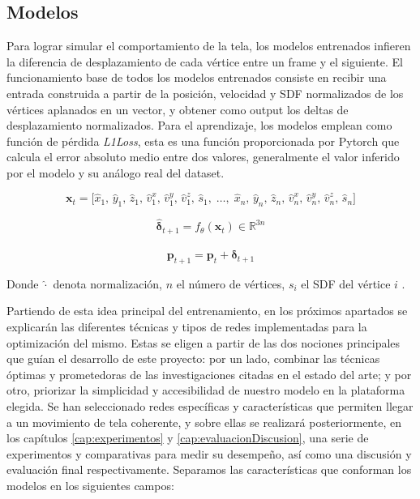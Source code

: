 \subsection{Modelos}
Para lograr simular el comportamiento de la tela, los modelos entrenados infieren la diferencia de desplazamiento de cada vértice entre un frame y el siguiente. El funcionamiento base de todos los modelos entrenados consiste en recibir una entrada construida a partir de la posición, velocidad y SDF normalizados de los vértices aplanados en un vector, y obtener como output los deltas de desplazamiento normalizados. Para el aprendizaje, los modelos emplean como función de pérdida \textit{L1Loss}, esta es una función proporcionada por Pytorch que calcula el error absoluto medio entre dos valores, generalmente el valor inferido por el modelo y su análogo real del dataset. \newline

\begin{equation}
    \mathbf{x}_{t} = \bigl[
        \hat{x}_1,\, \hat{y}_1,\, \hat{z}_1,\,
        \hat{v}^x_1,\, \hat{v}^y_1,\, \hat{v}^z_1,\,
        \hat{s}_1,\;
        \ldots,\;
        \hat{x}_n,\, \hat{y}_n,\, \hat{z}_n,\,
        \hat{v}^x_n,\, \hat{v}^y_n,\, \hat{v}^z_n,\,
        \hat{s}_n
    \bigr]
\end{equation}

\begin{equation}
    \hat{\boldsymbol{\delta}}_{t+1} = f_\theta(\mathbf{x}_{t}) \in \mathbb{R}^{3n}
\end{equation}

\begin{equation}
    \mathbf{p}_{t+1} = \mathbf{p}_{t} + \hat{\boldsymbol{\delta}}_{t+1}
\end{equation}

Donde $\hat{\cdot}$ denota normalización, $n$ el número de vértices, $s_i$ el SDF del vértice $i$ . \newline

Partiendo de esta idea principal del entrenamiento, en los próximos apartados se explicarán las diferentes técnicas y tipos de redes implementadas para la optimización del mismo. Estas se eligen a partir de las dos nociones principales que guían el desarrollo de este proyecto: por un lado, combinar las técnicas óptimas y prometedoras de las investigaciones citadas en el estado del arte; y por otro, priorizar la simplicidad y accesibilidad de nuestro modelo en la plataforma elegida. Se han seleccionado redes específicas y características que permiten llegar a un movimiento de tela coherente, y sobre ellas se realizará posteriormente, en los capítulos \ref{cap:experimentos} y \ref{cap:evaluacionDiscusion}, una serie de experimentos y comparativas para medir su desempeño, así como una discusión y evaluación final respectivamente. Separamos las características que conforman los modelos en los siguientes campos:

